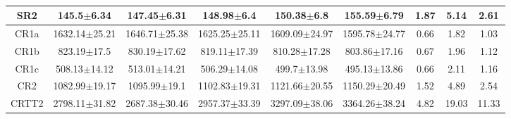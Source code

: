 \documentclass[12pt]{paper}
\begin{document}
\begin{table}[ht]
\begin{center}
{\begin{tabular}{c|ccccc|c|c|c}
\hline
SR2 & 145.5$\pm$6.34 & 147.45$\pm$6.31 & 148.98$\pm$6.4 & 150.38$\pm$6.8 & 155.59$\pm$6.79 & 1.87 & 5.14 & 2.61\\ 
\hline
\hline
CR1a & 1632.14$\pm$25.21 & 1646.71$\pm$25.38 & 1625.25$\pm$25.11 & 1609.09$\pm$24.97 & 1595.78$\pm$24.77 & 0.66 & 1.82 & 1.03\\ 
CR1b & 823.19$\pm$17.5 & 830.19$\pm$17.62 & 819.11$\pm$17.39 & 810.28$\pm$17.28 & 803.86$\pm$17.16 & 0.67 & 1.96 & 1.12\\ 
CR1c & 508.13$\pm$14.12 & 513.01$\pm$14.21 & 506.29$\pm$14.08 & 499.7$\pm$13.98 & 495.13$\pm$13.86 & 0.66 & 2.11 & 1.16\\ 
CR2 & 1082.99$\pm$19.17 & 1095.99$\pm$19.1 & 1102.83$\pm$19.31 & 1121.66$\pm$20.55 & 1150.29$\pm$20.49 & 1.52 & 4.89 & 2.54\\ 
CRTT2 & 2798.11$\pm$31.82 & 2687.38$\pm$30.46 & 2957.37$\pm$33.39 & 3297.09$\pm$38.06 & 3364.26$\pm$38.24 & 4.82 & 19.03 & 11.33\\ 

\end{tabular}}
\end{center}\caption*{}\end{table}
\end{document}
